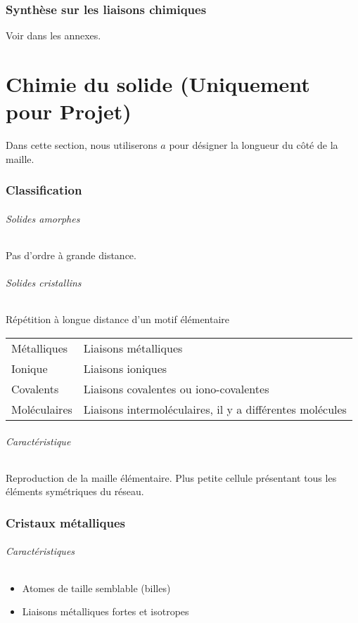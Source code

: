 \section{Synthèse sur les liaisons chimiques}

Voir  dans les annexes.

\part{Chimie du solide (Uniquement pour Projet)}
Dans cette section,
nous utiliserons $a$ pour désigner la longueur du côté de la maille.

\section{Classification}

\paragraph{Solides amorphes}
Pas d'ordre à grande distance.

\paragraph{Solides cristallins}
Répétition à longue distance d'un motif élémentaire
\begin{center}
  \begin{tabular}{ll}
    Métalliques & Liaisons métalliques\\
    Ionique & Liaisons ioniques\\
    Covalents & Liaisons covalentes ou iono-covalentes\\
    Moléculaires & Liaisons intermoléculaires, il y a différentes molécules
  \end{tabular}
\end{center}

\paragraph{Caractéristique}
Reproduction de la maille élémentaire.
Plus petite cellule présentant tous les éléments symétriques du réseau.

\section{Cristaux métalliques}

\paragraph{Caractéristiques}
\begin{itemize}
  \item Atomes de taille semblable (billes)
  \item Liaisons métalliques fortes et isotropes
\end{itemize}

